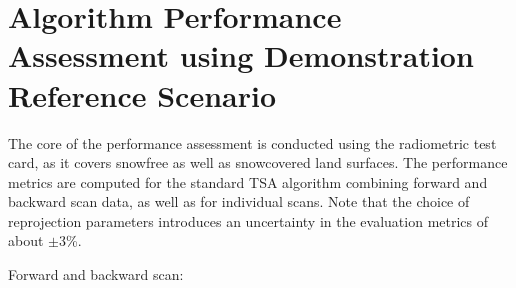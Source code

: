 \documentclass[letterpaper,10pt,english]{jupyterBook}
\begin{document}
\section{Algorithm Performance Assessment using Demonstration Reference Scenario}
\label{\detokenize{book/algorithm_performance_assessment:algorithm-performance-assessment-using-demonstration-reference-scenario}}
\sphinxAtStartPar
The core of the performance assessment is conducted using the radiometric test card, as it covers snow\sphinxhyphen{}free as well as snow\sphinxhyphen{}covered land surfaces.
The performance metrics are computed for the standard TSA algorithm combining forward and backward scan data, as well as for individual scans.
Note that the choice of reprojection parameters introduces an uncertainty in the evaluation metrics of about \(\pm\)3\%.

\sphinxAtStartPar
Forward and backward scan:
\end{document}
